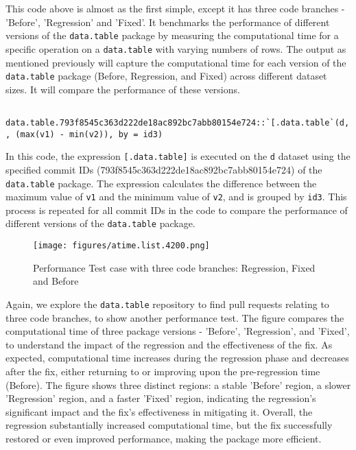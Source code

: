 \noindent This code above is almost as the first simple, except it has three code branches - 'Before', 'Regression' and 'Fixed'. It benchmarks the performance of different versions of the \texttt{data.table} package by measuring the computational time for a specific operation on a \texttt{data.table} with varying numbers of rows.
The output as mentioned previously will capture the computational time for each version of the \texttt{data.table} package (Before, Regression, and Fixed) across different dataset sizes. It will compare the performance of these versions. \\

    \begin{verbatim}
    data.table.793f8545c363d222de18ac892bc7abb80154e724::`[.data.table`(d, , (max(v1) - min(v2)), by = id3)  
    \end{verbatim}
    
\vspace{0.1in}
\noindent In this code, the expression \texttt{[.data.table]} is executed on the \texttt{d} dataset using the specified commit IDs (793f8545c363d222de18ac892bc7abb80154e724) of the \texttt{data.table} package. The expression calculates the difference between the maximum value of \texttt{v1} and the minimum value of \texttt{v2}, and is grouped by \texttt{id3}. This process is repeated for all commit IDs in the code to compare the performance of different versions of the \texttt{data.table} package.\\

\begin{figure}[H]
    \centering
    \texttt{[image: figures/atime.list.4200.png]}
    \caption{Performance Test case with three code branches: Regression, Fixed and Before}
    \label{fig:label4}
\end{figure}

\noindent Again, we explore the \texttt{data.table} repository to find pull requests relating to three code branches, to show another performance test. The figure compares the computational time of three package versions - 'Before', 'Regression', and 'Fixed', to understand the impact of the regression and the effectiveness of the fix. As expected, computational time increases during the regression phase and decreases after the fix, either returning to or improving upon the pre-regression time (Before). The figure shows three distinct regions: a stable 'Before' region, a slower 'Regression' region, and a faster 'Fixed' region, indicating the regression's significant impact and the fix's effectiveness in mitigating it. Overall, the regression substantially increased computational time, but the fix successfully restored or even improved performance, making the package more efficient.\\

